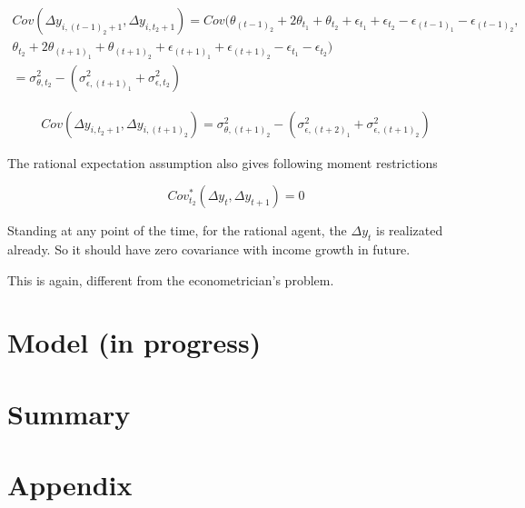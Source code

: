 \documentclass[12pt,notitlepage,onecolumn,aps,pra]{article}
\begin{document}
\begin{equation}
\begin{split}
Cov ( \Delta y_{i,(t-1)_2+1},\Delta y_{i,t_2+1}) = Cov(\theta_{(t-1)_2} + 2\theta_{t_1} + \theta_{t_2} + \epsilon_{t_1} + \epsilon_{t_2} - \epsilon_{(t-1)_1} - \epsilon_{(t-1)_2} , \\
\theta_{t_2} + 2\theta_{(t+1)_1} + \theta_{(t+1)_2} + \epsilon_{(t+1)_1} + \epsilon_{(t+1)_2} - \epsilon_{t_1} - \epsilon_{t_2} ) \\
= \sigma^2_{\theta,t_2}-(\sigma^2_{\epsilon,(t+1)_1} + \sigma^2_{\epsilon,t_2})
\end{split}
\end{equation}

\begin{equation}
\begin{split}
Cov ( \Delta y_{i,t_2+1},\Delta y_{i,(t+1)_2}) = \sigma^2_{\theta,(t+1)_2}-(\sigma^2_{\epsilon,(t+2)_1} + \sigma^2_{\epsilon,(t+1)_2})
\end{split}
\end{equation}

The rational expectation assumption also gives following moment
restrictions

\begin{equation}
Cov^*_{t_2}(\Delta y_t, \Delta y_{t+1}) = 0
\end{equation}

Standing at any point of the time, for the rational agent, the
\(\Delta y_t\) is realizated already. So it should have zero covariance
with income growth in future.

This is again, different from the econometrician's problem.

    \hypertarget{model-in-progress}{%
\section{Model (in progress)}\label{model-in-progress}}

    \hypertarget{summary}{%
\section{Summary}\label{summary}}

    \hypertarget{appendix}{%
\section{Appendix}\label{appendix}}
\end{document}
